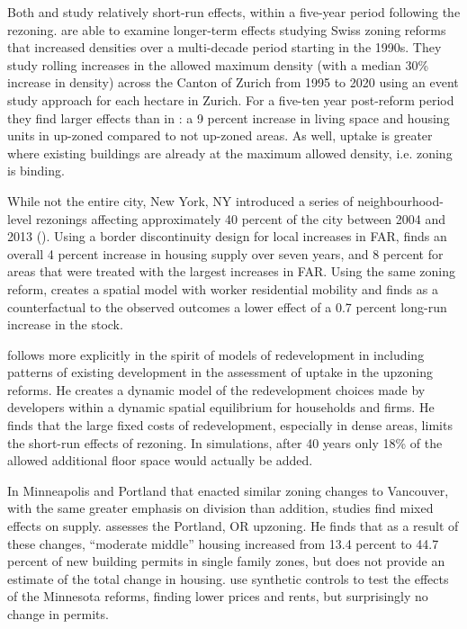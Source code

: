 \documentclass[12pt]{article}
\begin{document}
Both \textcite{Anagol_etal2021} and \textcite{GreenawayPhillips2023} study relatively short-run effects, within a five-year period following the rezoning. \textcite{BuchlerLutz2024} are able to examine longer-term effects studying Swiss zoning reforms that increased densities over a multi-decade period starting in the 1990s. They study rolling increases in the allowed maximum density (with a median 30\% increase in density) across the Canton of Zurich from 1995 to 2020 using an event study approach for each hectare in Zurich. For a five-ten year post-reform period they find larger effects than in \textcite{Anagol_etal2021}: a 9 percent increase in living space and housing units in up-zoned compared to not up-zoned areas. As well, uptake is greater where existing buildings are already at the maximum allowed density, i.e. zoning is binding. 

While not the entire city, New York, NY introduced a series of neighbourhood-level rezonings affecting approximately 40 percent of the city between 2004 and 2013 (\textcite{Liao2023}). Using a border discontinuity design for local increases in FAR, \textcite{Liao2023} finds an overall 4 percent increase in housing supply over seven years, and 8 percent for areas that were treated with the largest increases in FAR. Using the same zoning reform, \textcite{Peng2023} creates a spatial model with worker residential mobility and finds as a counterfactual to the observed outcomes a lower effect of a 0.7 percent long-run increase in the stock. 

\textcite{Rollet_2025} follows more explicitly in the spirit of models of redevelopment in including patterns of existing development in the assessment of uptake in the upzoning reforms. He creates a dynamic model of the redevelopment choices made by developers within a dynamic spatial equilibrium for households and firms. He finds that the large fixed costs of redevelopment, especially in dense areas, limits the short-run effects of rezoning. In simulations, after 40 years only 18\% of the allowed additional floor space would actually be added.  

In Minneapolis and Portland that enacted similar zoning changes to Vancouver, with the same greater emphasis on division than addition, studies find mixed effects on supply. \textcite{Dong2024a} assesses the Portland, OR upzoning. He finds that as a result of these changes, ``moderate middle'' housing increased from 13.4 percent to 44.7 percent of new building permits in single family zones, but does not provide an estimate of the total change in housing. \textcite{GuMunro_2025} use synthetic controls to test the effects of the Minnesota reforms, finding lower prices and rents, but surprisingly no change in permits.
\end{document}
